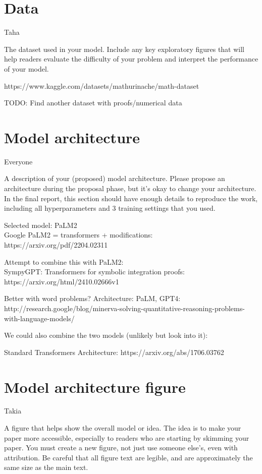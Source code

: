 \documentclass{article}
\begin{document}
\section{Data}
Taha 

The dataset used in your model. Include any key
exploratory figures that will help readers evaluate the
difficulty of your problem and interpret the performance
of your model.

https://www.kaggle.com/datasets/mathurinache/math-dataset
\cite{hendrycksmath2021}

TODO: Find another dataset with proofs/numerical data


\section{Model architecture}
Everyone

A description of your (proposed) model architecture.
Please propose an architecture during the proposal
phase, but it's okay to change your architecture. In the
final report, this section should have enough details to
reproduce the work, including all hyperparameters and 3 training settings that you used.

 
Selected model: PaLM2 \\
Google PaLM2 = transformers + modifications: https://arxiv.org/pdf/2204.02311

Attempt to combine this with PaLM2: \\
SympyGPT: Transformers for symbolic integration proofs: https://arxiv.org/html/2410.02666v1


Better with word problems?
Architecture: PaLM, GPT4: http://research.google/blog/minerva-solving-quantitative-reasoning-problems-with-language-models/

We could also combine the two models (unlikely but look into it):

Standard Transformers Architecture: https://arxiv.org/abs/1706.03762

\section{Model architecture figure}
Takia

A figure that helps show the overall model or idea. The
idea is to make your paper more accessible, especially
to readers who are starting by skimming your paper.
You must create a new figure, not just use someone
else's, even with attribution. Be careful that all figure
text are legible, and are approximately the same size
as the main text.
\end{document}
